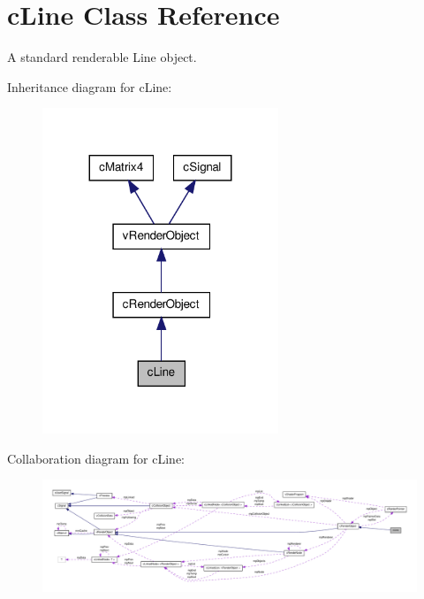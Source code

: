 \hypertarget{classc_line}{
\section{cLine Class Reference}
\label{classc_line}
}


A standard renderable Line object.  




Inheritance diagram for cLine:
\nopagebreak
\begin{figure}[H]
\begin{center}
\leavevmode
\includegraphics[width=200pt]{classc_line__inherit__graph}
\end{center}
\end{figure}


Collaboration diagram for cLine:
\nopagebreak
\begin{figure}[H]
\begin{center}
\leavevmode
\includegraphics[width=400pt]{classc_line__coll__graph}
\end{center}
\end{figure}
